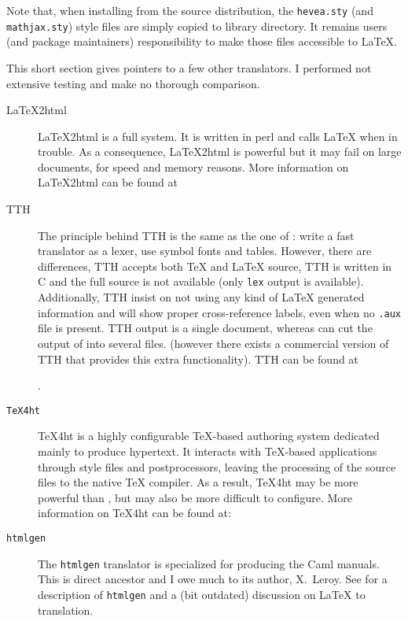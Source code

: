 \label{installsty}Note that, when installing \hevea{} from the source distribution, the
\texttt{hevea.sty} (and \texttt{mathjax.sty}) style files are
simply copied to \hevea{} library directory.
It remains users (and package maintainers) responsibility to make those
files accessible to \LaTeX.

This short section gives pointers to a few other translators. I
performed not extensive testing and make no thorough comparison.

\begin{description}
\item[LaTeX2html]
LaTeX2html is a full system. It is written in perl and
calls \LaTeX{} when in trouble.
As a consequence, LaTeX2html is powerful but it may fail on
large documents, for speed and memory reasons.
More information on LaTeX2html can be found at
\begin{center}
\end{center}

\item[TTH] The principle behind TTH is the same as the one of
\hevea{}: write a fast translator as a lexer, use symbol fonts and
tables. However, there are differences, TTH accepts both \TeX{} and
\LaTeX{} source, 
TTH is written in C and the full source is not available
(only \verb+lex+ output is available).
Additionally, TTH  insist on not using any kind of \LaTeX{}
generated information and will show proper cross-reference labels,
even when no \texttt{.aux} file is present.
TTH output is a single document,
whereas \hacha{} can cut the output of \hevea{} into several files.
(however there exists a commercial
version of TTH that provides this extra functionality).
TTH can be found at
\begin{center}
.
\end{center}

\item[\texttt{TeX4ht}]
TeX4ht is a highly configurable TeX-based authoring system dedicated
mainly to produce hypertext.
It interacts with TeX-based applications through style files
and postprocessors, leaving the processing of the source files
to the native TeX compiler. As a result, TeX4ht may be more powerful
than \hevea{}, but may also be more difficult to configure.
More information on TeX4ht can be found at:
\begin{center}
\end{center}
\item[\texttt{htmlgen}] The \texttt{htmlgen} translator is specialized
for producing the Caml manuals. This is \hevea{} direct ancestor and I
owe much to its author, X.~Leroy. See \cite{htmlgen} for a description
of \texttt{htmlgen} and a (bit outdated) discussion on \LaTeX{} to
\html{} translation.
\end{description}

